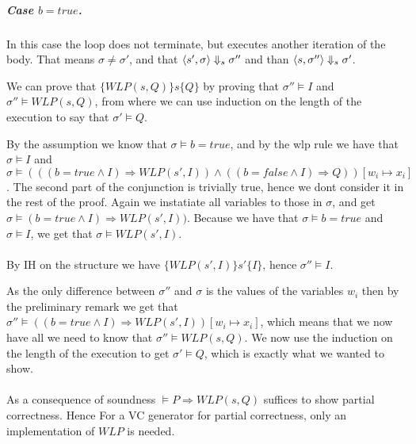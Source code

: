 \subparagraph{Case $b = true $.}
In this case the loop does not terminate, but executes another iteration of the body.
That means $\sigma \neq \sigma'$, and that $\langle s',\sigma \rangle \Downarrow_{s} \sigma''$ and than $\langle s, \sigma'' \rangle \Downarrow_{s} \sigma'$.


We can prove that $\{WLP(s, Q)\}s\{Q\}$ by proving that $\sigma'' \vDash I$ and $\sigma'' \vDash WLP(s, Q)$,
from where we can use induction on the length of the execution to say that $\sigma' \vDash Q$.

By the assumption we know that $\sigma \vDash b = true$,
and by the wlp rule we have that $\sigma \vDash I$ and
$\sigma \vDash (((b = true \land I) \Rightarrow WLP(s', I)) \wedge ((b = false \wedge I) \Rightarrow Q)) [ w_{i} \mapsto x_{i}]$.
The second part of the conjunction is trivially true, hence we dont consider it in the rest of the proof.
Again we instatiate all variables to those in $\sigma$, and get $\sigma \vDash (b = true \land I) \Rightarrow WLP(s', I))$.
Because we have that $\sigma \vDash b = true$ and $\sigma \vDash I$, we get that $\sigma \vDash WLP(s', I)$.
\\~\\

By IH on the structure we have $\{WLP(s', I)\}s'\{I\}$, hence $\sigma'' \vDash I$.

As the only difference between $\sigma''$ and $\sigma$ is the values of the variables $w_{i}$ then by the preliminary remark we get that $\sigma'' \vDash ((b = true \land I) \Rightarrow WLP(s', I)) [ w_{i} \mapsto x_{i}]$,
which means that we now have all we need to know that $\sigma'' \vDash WLP(s, Q)$.
We now use the induction on the length of the execution to get $\sigma' \vDash Q$,
which is exactly what we wanted to show.
\\~\\
As a consequence of soundness $\vDash P \Rightarrow WLP(s, Q)$ suffices to show partial correctness.
Hence For a VC generator for partial correctness, only an implementation of $WLP$ is needed.
